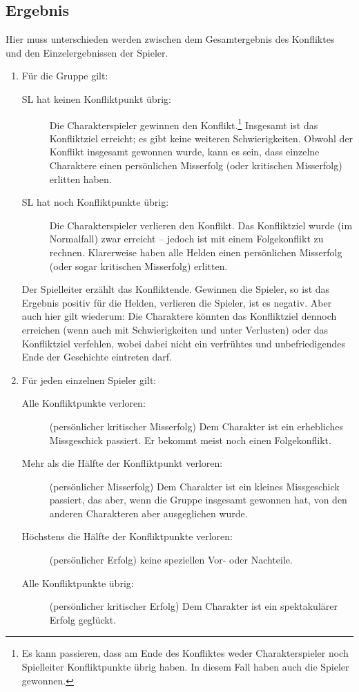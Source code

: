 \subsection{Ergebnis}
Hier muss unterschieden werden zwischen dem Gesamtergebnis des Konfliktes und den Einzelergebnissen der Spieler.

\begin{enumerate}
\item Für die Gruppe gilt:
\begin{description}
\item[SL hat keinen Konfliktpunkt übrig:] Die Charakterspieler gewinnen den Konflikt.\footnote{Es kann passieren, dass am Ende des Konfliktes weder Charakterspieler noch Spielleiter Konfliktpunkte übrig haben. In diesem Fall haben auch die Spieler gewonnen.} Insgesamt ist das Konfliktziel erreicht; es gibt keine weiteren Schwierigkeiten. Obwohl der Konflikt insgesamt gewonnen wurde, kann es sein, dass einzelne Charaktere einen persönlichen Misserfolg (oder kritischen Misserfolg) erlitten haben.
  \item[SL hat noch Konfliktpunkte übrig:] Die Charakterspieler verlieren den Konflikt. Das Konfliktziel wurde (im Normalfall) zwar erreicht -- jedoch ist mit einem Folgekonflikt zu rechnen. Klarerweise haben alle Helden einen persönlichen Misserfolg (oder sogar kritischen Misserfolg) erlitten.
\end{description}

 Der Spielleiter erzählt das Konfliktende. Gewinnen die Spieler, so ist das Ergebnis positiv für die Helden, verlieren die Spieler, ist es negativ. Aber auch hier gilt wiederum:
Die Charaktere könnten das Konfliktziel dennoch erreichen (wenn auch mit Schwierigkeiten und unter Verlusten) oder das Konfliktziel verfehlen, wobei dabei nicht ein verfrühtes und unbefriedigendes Ende der Geschichte eintreten darf.

\item Für jeden einzelnen Spieler gilt:
\begin{description}
  \item[Alle Konfliktpunkte verloren:] (persönlicher kritischer Misserfolg) Dem Charakter ist ein erhebliches Missgeschick passiert. Er bekommt meist noch einen Folgekonflikt.
  \item[Mehr als die Hälfte der Konfliktpunkt verloren:] (persönlicher Misserfolg) Dem Charakter ist ein kleines Missgeschick passiert, das aber, wenn die Gruppe insgesamt gewonnen hat, von den anderen Charakteren aber ausgeglichen wurde.
  \item[Höchstens die Hälfte der Konfliktpunkte verloren:] (persönlicher Erfolg) keine speziellen Vor- oder Nachteile.
  \item[Alle Konfliktpunkte übrig:] (persönlicher kritischer Erfolg) Dem Charakter ist ein spektakulärer Erfolg geglückt.
\end{description}
\end{enumerate}


